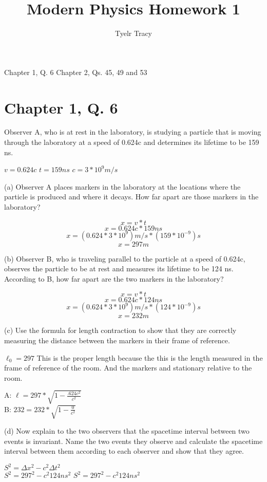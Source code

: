 \documentclass{article}
\title{Modern Physics Homework 1}
\author{Tyelr Tracy}
\begin{document}
\maketitle

Chapter 1, Q. 6
Chapter 2, Qs. 45, 49 and 53

\section*{Chapter 1, Q. 6}

Observer A, who is at rest in the laboratory, is studying a
particle that is moving through the laboratory at a speed of
0.624c and determines its lifetime to be 159 ns.

$v = 0.624c$
$t = 159 ns$
$c = 3*10^9 m/s$

(a) Observer A places markers in the laboratory at the locations where
the particle is produced and where it decays. How far apart
are those markers in the laboratory?

$$ x = v * t $$
$$ x = 0.624c * 159 ns $$
$$ x = (0.624 * 3 * 10^9) m/s * (159 * 10^{-9})s  $$
$$ x = 297 m  $$


(b) Observer B, who is traveling parallel to the particle at a speed of 0.624c,
observes the particle to be at rest and measures its lifetime to
be 124 ns. According to B, how far apart are the two markers
in the laboratory?

$$ x = v * t $$
$$ x = 0.624c * 124 ns $$
$$ x = (0.624 * 3 * 10^9) m/s * (124 * 10^{-9})s  $$
$$ x = 232 m  $$


(c) Use the formula for length contraction to show that they are correctly measuring the distance between the markers in their frame of reference.


$ \ell_0 =  297 $ This is the proper length because the this is the length measured in the frame of reference of the room. And the markers and stationary relative to the room.

A: $\ell = 297 * \sqrt{1 - \frac{.624c^2}{c^2}}$ \\
B: $232 = 232 * \sqrt{1 - \frac{0}{c^2}}$


(d) Now explain to the two observers that the spacetime interval between two events is invariant. Name the two events they observe and calculate the spacetime interval between them according to each observer and show that they agree.


$S^2 = \Delta x^2 - c^2 \Delta t^2$ \\
$S^2 = 297^2 - c^2 124ns^2$
$S^2 = 297^2 - c^2 124ns^2$
\end{document}
